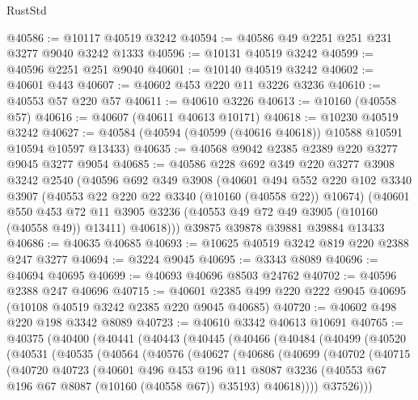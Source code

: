 \begin{lexlean}{RustStd}
\begin{coremodule}
@40586 := @10117 @40519 @3242
@40594 := @40586 @49 @2251 @251 @231 @3277 @9040 @3242 @1333
@40596 := @10131 @40519 @3242
@40599 := @40596 @2251 @251 @9040
@40601 := @10140 @40519 @3242
@40602 := @40601 @443
@40607 := @40602 @453 @220 @11 @3226 @3236
@40610 := @40553 @57 @220 @57
@40611 := @40610 @3226
@40613 := @10160 (@40558 @57)
@40616 := @40607 (@40611 @40613 @10171)
@40618 := @10230 @40519 @3242
@40627 := @40584 (@40594 (@40599 (@40616 @40618)) @10588 @10591 @10594 @10597 @13433)
@40635 := @40568 @9042 @2385 @2389 @220 @3277 @9045 @3277 @9054
@40685 := @40586
    @228
    @692
    @349
    @220
    @3277
    @3908
    @3242
    @2540
    (@40596
      @692
      @349
      @3908
      (@40601
        @494
        @552
        @220
        @102
        @3340
        @3907
        (@40553 @22 @220 @22 @3340 (@10160 (@40558 @22)) @10674)
        (@40601
          @550
          @453
          @72
          @11
          @3905
          @3236
          (@40553 @49 @72 @49 @3905 (@10160 (@40558 @49)) @13411)
          @40618)))
    @39875
    @39878
    @39881
    @39884
    @13433
@40686 := @40635 @40685
@40693 := @10625 @40519 @3242 @819 @220 @2388 @247 @3277
@40694 := @3224 @9045
@40695 := @3343 @8089
@40696 := @40694 @40695
@40699 := @40693 @40696 @8503 @24762
@40702 := @40596 @2388 @247 @40696
@40715 := @40601 @2385 @499 @220 @222 @9045 @40695 (@10108 @40519 @3242 @2385 @220 @9045 @40685)
@40720 := @40602 @498 @220 @198 @3342 @8089
@40723 := @40610 @3342 @40613 @10691
@40765 := @40375
    (@40400
      (@40441
        (@40443
          (@40445
            (@40466
              (@40484
                (@40499
                  (@40520
                    (@40531
                      (@40535
                        (@40564
                          (@40576
                            (@40627
                              (@40686
                                (@40699
                                  (@40702
                                    (@40715
                                      (@40720
                                        @40723
                                        (@40601
                                          @496
                                          @453
                                          @196
                                          @11
                                          @8087
                                          @3236
                                          (@40553 @67 @196 @67 @8087 (@10160 (@40558 @67)) @35193)
                                          @40618))))
                                  @37526)))

\end{coremodule}
\end{lexlean}
